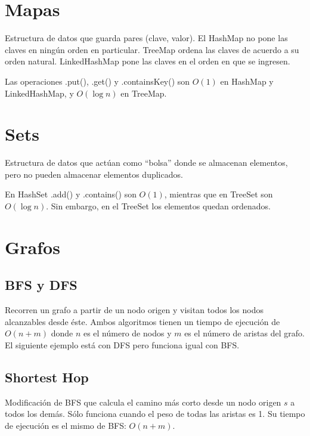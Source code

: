 \documentclass{article}
\begin{document}
\begin{multicols}{2}

\tableofcontents

\section{Mapas}
Estructura de datos que guarda pares (clave, valor). El HashMap no pone las claves en ningún orden en particular. TreeMap ordena las claves de acuerdo a su orden natural. LinkedHashMap pone las claves en el orden en que se ingresen.

Las operaciones .put(), .get() y .containsKey() son \( O(1) \) en HashMap y LinkedHashMap, y \( O(\log n)\) en TreeMap.


\section{Sets}
Estructura de datos que actúan como ``bolsa'' donde se almacenan elementos, pero no pueden almacenar elementos duplicados.

En HashSet .add() y .contains() son \( O(1) \), mientras que en TreeSet son \( O(\log n)\). Sin embargo, en el TreeSet los elementos quedan ordenados.


\section{Grafos}
	\subsection{BFS y DFS}
	Recorren un grafo a partir de un nodo origen y visitan todos los nodos alcanzables desde éste. Ambos algoritmos tienen un tiempo de ejecución de \( O(n + m) \) donde \( n \) es el número de nodos y \( m \) es el número de aristas del grafo. El siguiente ejemplo está con DFS pero funciona igual con BFS.	
	

	\subsection{Shortest Hop}
	Modificación de BFS que calcula el camino más corto desde un nodo origen \(s\) a todos los demás. Sólo funciona cuando el peso de todas las aristas es 1. Su tiempo de ejecución es el mismo de BFS: \( O(n + m) \).
	
	

\end{multicols}
\end{document}
